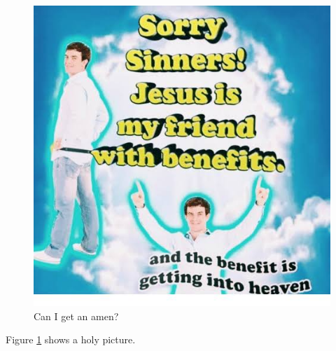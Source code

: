 \documentclass{article}
\begin{document}
	\begin{figure}
		\includegraphics[width=\linewidth]{pic.jpeg}
			\caption{Can I get an amen?}
			\label{fig:boat1}
	\end{figure}
Figure \ref{fig:boat1} shows a holy picture.
\end{document}

